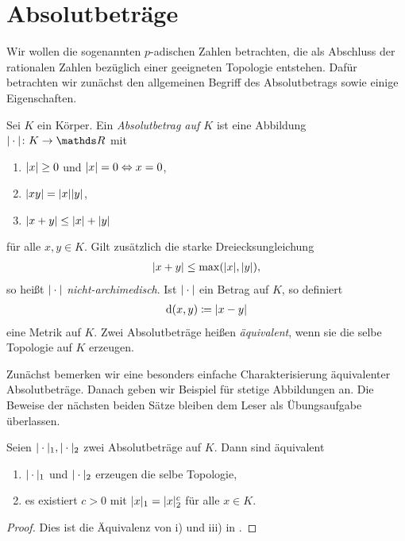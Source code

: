\chapter{Absolutbeträge}

Wir wollen die sogenannten $p$-adischen Zahlen betrachten, die als
Abschluss der rationalen Zahlen bezüglich einer geeigneten Topologie entstehen.
Dafür betrachten wir zunächst den allgemeinen Begriff des Absolutbetrags sowie einige Eigenschaften.

\begin{defi}
Sei $K$ ein Körper. Ein \emph{Absolutbetrag auf $K$} ist eine Abbildung $|\cdot|\colon K \to \R$ mit
\begin{enumerate}[label=\roman*)]
\item $|x|\geq 0$ und $|x|=0 \Leftrightarrow x=0$,
\item $|xy|=|x||y|$,
\item $|x+y|\leq |x|+|y|$
\end{enumerate}
für alle $x,y\in K$.
Gilt zusätzlich die starke Dreiecksungleichung
\begin{align*}
|x+y|\leq \max(|x|,|y|),
\end{align*}
so heißt $|\cdot|$ \emph{nicht-archimedisch}.
Ist $|\cdot|$ ein Betrag auf $K$, so definiert
\begin{align*}
\operatorname{d}(x,y)\coloneqq |x-y|
\end{align*}
eine Metrik auf $K$.
Zwei Absolutbeträge heißen \emph{äquivalent}, wenn sie die selbe Topologie auf $K$ erzeugen.
\end{defi}

Zunächst bemerken wir eine besonders einfache Charakterisierung äquivalenter Absolutbeträge.
Danach geben wir Beispiel für stetige Abbildungen an.
Die Beweise der nächsten beiden Sätze bleiben dem Leser als Übungsaufgabe überlassen.


\begin{satz}
Seien $|\cdot|_1,|\cdot|_2$ zwei Absolutbeträge auf $K$.
Dann sind äquivalent
\begin{enumerate}[label=\roman*)]
\item $|\cdot|_1$ und $|\cdot|_2$ erzeugen die selbe Topologie,
\item es existiert $c>0$ mit $|x|_1=|x|_2^c$ für alle $x\in K$.
\end{enumerate}
\end{satz}
\begin{proof}
Dies ist die Äquivalenz von i) und iii) in \cite[Lemma 3.1.2]{Gouvea}.
\end{proof}

